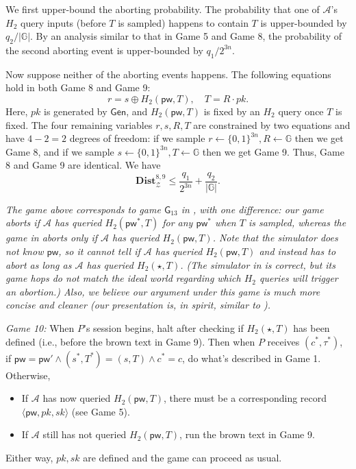 \documentclass{article}
\theoremstyle{plain}
\theoremstyle{definition}
\theoremstyle{remark}
\newcommand{\group}{\mathbb{G}}
\newcommand{\adv}{\mathcal{A}}
\newcommand{\env}{\mathcal{Z}}
\newcommand{\Dist}{\mathbf{Dist}}
\newcommand{\Gen}{\mathsf{Gen}}
\newcommand{\pw}{\mathsf{pw}}
\begin{document}
We first upper-bound the aborting probability. The probability that one of $\adv$'s $H_2$ query inputs (before $T$ is sampled) happens to contain $T$ is upper-bounded by $q_2/|\group|$. By an analysis similar to that in Game 5 and Game 8, the probability of the second aborting event is upper-bounded by $q_1/2^{3n}$.

Now suppose neither of the aborting events happens. The following equations hold in both Game 8 and Game 9:
\[
r = s \oplus H_2(\pw,T), \quad T = R \cdot pk.
\]
Here, $pk$ is generated by $\Gen$, and $H_2(\pw,T)$ is fixed by an $H_2$ query once $T$ is fixed. The four remaining variables $r,s,R,T$ are constrained by two equations and have $4-2=2$ degrees of freedom: if we sample $r \gets \{0,1\}^{3n}, R \gets \group$ then we get Game 8, and if we sample $s \gets \{0,1\}^{3n}, T \gets \group$ then we get Game 9. Thus, Game 8 and Game 9 are identical. We have
\[
\Dist_\env^{8,9} \leq \frac{q_1}{2^{3n}} + \frac{q_2}{|\group|}.
\]

\emph{{\color{red}The game above corresponds to game $\mathsf{G}_{13}$ in \cite{EPRINT:ArrBarJar25}, with one difference: our game aborts if $\adv$ has queried $H_2(\pw^*,T)$ for any $\pw^*$ when $T$ is sampled, whereas the game in \cite{EPRINT:ArrBarJar25} aborts only if $\adv$ has queried $H_2(\pw,T)$. Note that the simulator does not know $\pw$, so it cannot tell if $\adv$ has queried $H_2(\pw,T)$ and instead has to abort as long as $\adv$ has queried $H_2(\star,T)$. (The simulator in \cite{EPRINT:ArrBarJar25} is correct, but its game hops do not match the ideal world regarding which $H_2$ queries will trigger an abortion.) Also, we believe our argument under this game is much more concise and cleaner (our presentation is, in spirit, similar to \cite[Lemma~4.5,~Hybrid~2]{EC:JanRoyXu25}).}}

\medskip\noindent\emph{Game 10:} When $P$'s session begins, halt after checking if $H_2(\star,T)$ has been defined (i.e., before the {\color{brown} brown} text in Game 9). Then when $P$ receives $(c^*,\tau^*)$, if $\pw = \pw' \land (s^*,T^*) = (s,T) \land c^* = c$, do what's described in Game 1. Otherwise,
\begin{itemize}
  \item If $\adv$ has now queried $H_2(\pw,T)$, there must be a corresponding record $\langle\pw,pk,sk\rangle$ (see Game 5).
  \item If $\adv$ still has not queried $H_2(\pw,T)$, run the {\color{brown} brown} text in Game 9.
\end{itemize}
Either way, $pk,sk$ are defined and the game can proceed as usual.
\end{document}
